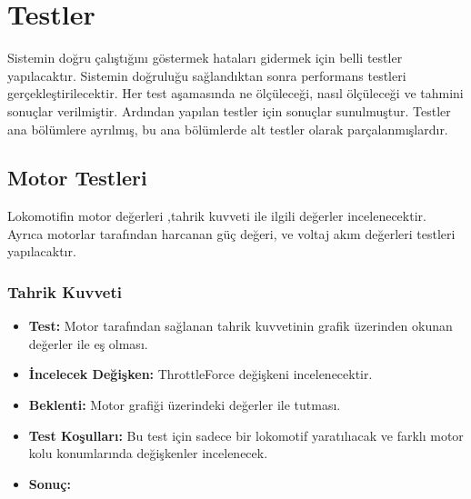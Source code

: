 \documentclass[10pt,a4paper]{article}
\begin{document}
\newpage

\section{Testler}
Sistemin doğru çalıştığını göstermek hataları gidermek için belli testler yapılacaktır. Sistemin doğruluğu sağlandıktan sonra performans testleri gerçekleştirilecektir. Her test aşamasında ne ölçüleceği, nasıl ölçüleceği ve tahmini sonuçlar verilmiştir. Ardından yapılan testler için sonuçlar sunulmuştur. Testler ana bölümlere ayrılmış, bu ana bölümlerde alt testler olarak parçalanmışlardır.

\subsection{Motor Testleri}
Lokomotifin motor değerleri ,tahrik kuvveti ile ilgili değerler incelenecektir. Ayrıca motorlar tarafından harcanan güç değeri, ve voltaj akım değerleri testleri yapılacaktır.

\subsubsection{Tahrik Kuvveti}
\begin{itemize}
\item \textbf{Test:} Motor tarafından sağlanan tahrik kuvvetinin grafik üzerinden okunan değerler ile eş olması.\\
\item \textbf{İncelecek Değişken:} ThrottleForce değişkeni incelenecektir.\\
\item \textbf{Beklenti:} Motor grafiği üzerindeki değerler ile tutması.\\
\item \textbf{Test Koşulları:} Bu test için sadece bir lokomotif yaratılıacak ve farklı motor kolu konumlarında değişkenler incelenecek.\\
\item \textbf{Sonuç:}
\end{itemize}
\end{document}
